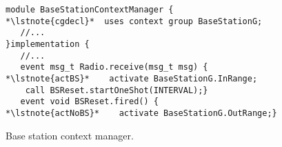 \begin{figure}[!tb]
\begin{lstlisting}[style=conescframe]
module BaseStationContextManager {
*\lstnote{cgdecl}*  uses context group BaseStationG;
   //...
}implementation {
   //...
   event msg_t Radio.receive(msg_t msg) {
*\lstnote{actBS}*    activate BaseStationG.InRange;
    call BSReset.startOneShot(INTERVAL);}
   event void BSReset.fired() {
*\lstnote{actNoBS}*    activate BaseStationG.OutRange;}
\end{lstlisting}
\vspace{-4mm}
\caption{Base station context manager.}
  \label{fig:bscm}
\vspace{-2mm}
\end{figure}